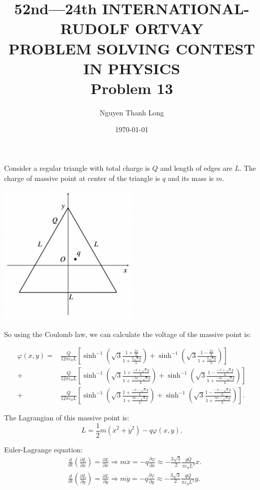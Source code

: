 \documentclass[12pt]{article}
\title{52nd—24th INTERNATIONAL-RUDOLF ORTVAY \\ PROBLEM SOLVING CONTEST IN PHYSICS \\ Problem 13}
\author{Nguyen Thanh Long}
\date{\today}
\begin{document}
	
\maketitle

\noindent Consider a regular triangle with total charge is $Q$ and length of edges are $L$. The charge of massive point at center of the triangle is $q$ and its mass is $m$.

\begin{center}
	\includegraphics[width=0.5\textwidth]{Fig P13.png}
\end{center}

\noindent So using the Coulomb law, we can calculate the voltage of the massive point is:	
	
\begin{align*}
	\varphi (x,y)= & \frac{Q}{12 \pi \varepsilon_0 L} \left[ \sinh^{-1} \left( \sqrt{3} \frac{1 + \frac{2x}{L}}{1 + \frac{2\sqrt{3}y}{L}} \right) + \sinh^{-1} \left( \sqrt{3} \frac{1 - \frac{2x}{L}}{1 + \frac{2\sqrt{3}y}{L}} \right) \right] \\
	+ & \frac{Q}{12 \pi \varepsilon_0 L} \left[ \sinh^{-1} \left( \sqrt{3} \frac{1 + \frac{-x + \sqrt{3} y}{L}}{1 + \frac{-3x -\sqrt{3}y}{L}} \right) + \sinh^{-1} \left( \sqrt{3} \frac{1 - \frac{-x + \sqrt{3} y}{L}}{1 + \frac{-3x -\sqrt{3}y}{L}} \right) \right] \\
	+ & \frac{Q}{12 \pi \varepsilon_0 L} \left[ \sinh^{-1} \left( \sqrt{3} \frac{1 + \frac{-x - \sqrt{3}y}{L}}{1 + \frac{3x - \sqrt{3}y}{L}} \right) + \sinh^{-1} \left( \sqrt{3} \frac{1 - \frac{-x - \sqrt{3}y}{L}}{1 + \frac{3x - \sqrt{3}y}{L}} \right) \right] .
\end{align*}	

\noindent The Lagrangian of this massive point is:
$$ L = \frac{1}{2} m \left( \dot{x}^2 + \dot{y}^2 \right) - q \varphi (x,y) .$$
	
\noindent Euler-Lagrange equation:
\begin{align*}
	& \frac{d}{dt} \left( \frac{ \partial L}{\partial \dot{x} } \right) = \frac{\partial L}{\partial x} \Rightarrow m \ddot{x} = - q \frac{\partial \varphi}{\partial x} \approx - \frac{3\sqrt{3}}{2} \frac{qQ}{\pi \varepsilon_0 L^3} x. \\
	& \frac{d}{dt} \left( \frac{ \partial L}{\partial \dot{y} } \right) = \frac{\partial L}{\partial y} \Rightarrow m \ddot{y} = - q \frac{\partial \varphi}{\partial y} \approx - \frac{3\sqrt{3}}{2} \frac{qQ}{\pi \varepsilon_0 L^3} y.
\end{align*}
\end{document}
